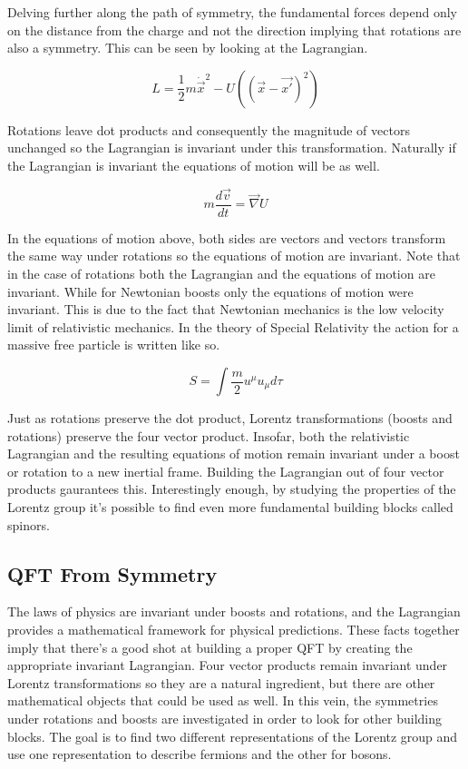 Delving further along the path of symmetry, the fundamental forces depend only on the distance from the charge and not the direction implying that rotations are also a symmetry. This can be seen by looking at the Lagrangian. 

\begin{equation}
L = \frac{1}{2} m\dot{\vec{x}}^2 - U((\vec{x} - \vec{x'})^2)
\end{equation}

Rotations leave dot products and consequently the magnitude of vectors unchanged so the Lagrangian is invariant under this transformation. Naturally if the Lagrangian is invariant the equations of motion will be as well.

\begin{equation}
m\frac{d\vec{v}}{dt} = \vec{\nabla} U
\end{equation}

In the equations of motion above, both sides are vectors and vectors transform the same way under rotations so the equations of motion are invariant. Note that in the case of rotations both the Lagrangian and the equations of motion are invariant. While for Newtonian boosts only the equations of motion were invariant. This is due to the fact that Newtonian mechanics is the low velocity limit of relativistic mechanics. In the theory of Special Relativity the action for a massive free particle is written like so.

\begin{equation}
S = \int \frac{m}{2}u^{\mu}u_{\mu}d\tau
\end{equation}

Just as rotations preserve the dot product, Lorentz transformations (boosts and rotations) preserve the four vector product. Insofar, both the relativistic Lagrangian and the resulting equations of motion remain invariant under a boost or rotation to a new inertial frame. Building the Lagrangian out of four vector products gaurantees this. Interestingly enough, by studying the properties of the Lorentz group it's possible to find even more fundamental building blocks called spinors.

\subsection{QFT From Symmetry}

The laws of physics are invariant under boosts and rotations, and the Lagrangian provides a mathematical framework for physical predictions. These facts together imply that there's a good shot at building a proper QFT by creating the appropriate invariant Lagrangian. Four vector products remain invariant under Lorentz transformations so they are a natural ingredient, but there are other mathematical objects that could be used as well. In this vein, the symmetries under rotations and boosts are investigated in order to look for other building blocks. The goal is to find two different representations of the Lorentz group and use one representation to describe fermions and the other for bosons.

